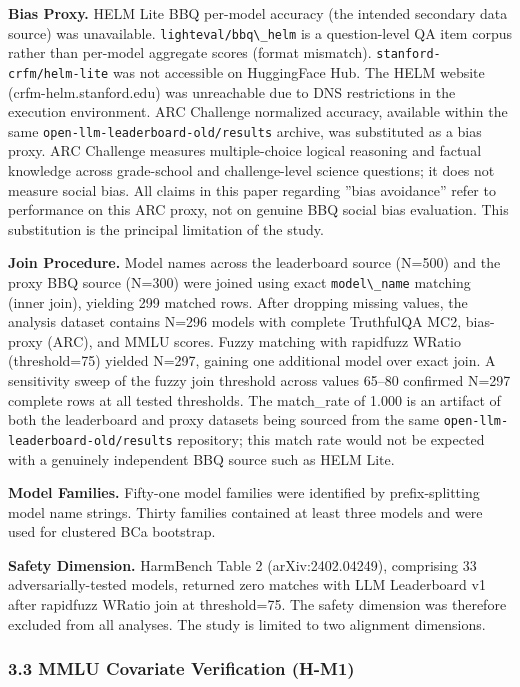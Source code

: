 \textbf{Bias Proxy.} HELM Lite BBQ per-model accuracy (the intended secondary data source) was unavailable. \texttt{lighteval/bbq\textbackslash \_helm} is a question-level QA item corpus rather than per-model aggregate scores (format mismatch). \texttt{stanford-crfm/helm-lite} was not accessible on HuggingFace Hub. The HELM website (crfm-helm.stanford.edu) was unreachable due to DNS restrictions in the execution environment. ARC Challenge normalized accuracy, available within the same \texttt{open-llm-leaderboard-old/results} archive, was substituted as a bias proxy. ARC Challenge measures multiple-choice logical reasoning and factual knowledge across grade-school and challenge-level science questions; it does not measure social bias. All claims in this paper regarding ''bias avoidance'' refer to performance on this ARC proxy, not on genuine BBQ social bias evaluation. This substitution is the principal limitation of the study.

\textbf{Join Procedure.} Model names across the leaderboard source (N=500) and the proxy BBQ source (N=300) were joined using exact \texttt{model\textbackslash \_name} matching (inner join), yielding 299 matched rows. After dropping missing values, the analysis dataset contains N=296 models with complete TruthfulQA MC2, bias-proxy (ARC), and MMLU scores. Fuzzy matching with rapidfuzz WRatio (threshold=75) yielded N=297, gaining one additional model over exact join. A sensitivity sweep of the fuzzy join threshold across values 65--80 confirmed N=297 complete rows at all tested thresholds. The match\_rate of 1.000 is an artifact of both the leaderboard and proxy datasets being sourced from the same \texttt{open-llm-leaderboard-old/results} repository; this match rate would not be expected with a genuinely independent BBQ source such as HELM Lite.

\textbf{Model Families.} Fifty-one model families were identified by prefix-splitting model name strings. Thirty families contained at least three models and were used for clustered BCa bootstrap.

\textbf{Safety Dimension.} HarmBench Table 2 (arXiv:2402.04249), comprising 33 adversarially-tested models, returned zero matches with LLM Leaderboard v1 after rapidfuzz WRatio join at threshold=75. The safety dimension was therefore excluded from all analyses. The study is limited to two alignment dimensions.

\subsubsection{3.3 MMLU Covariate Verification (H-M1)}

